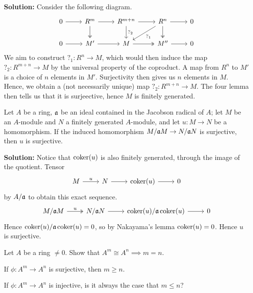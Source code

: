 \documentclass{article}
\begin{document}
\noindent\textbf{Solution:}
Consider the following diagram.
\[
    \begin{tikzcd}
        0 \arrow[r] & R^m \arrow[r] \arrow[d, two heads] & R^{m+n} \arrow[r] \arrow[d, "?_2"] & R^n \arrow[r] \arrow[dl, "?_1"] \arrow[d, two heads] & 0 \\
        0 \arrow[r] & M' \arrow[r] & M \arrow[r, two heads] & M'' \arrow[r] & 0
    \end{tikzcd}
\]
We aim to construct \(?_1 : R^n \to M\), which would then induce the map \(?_2 : R^{m+n} \to M\) by the universal property of the coproduct.
A map from \(R^n\) to \(M'\) is a choice of \(n\) elements in \(M'\).
Surjectivity then gives us \(n\) elements in \(M\).
Hence, we obtain a (not necessarily unique) map \(?_2 : R^{m+n} \to M\).
The four lemma then tells us that it is surjeective, hence \(M\) is finitely generated.

\begin{exercise}
    Let \(A\) be a ring, \(\mathfrak{a}\) be an ideal contained in the Jacobson radical of \(A\); let \(M\) be an \(A\)-module and \(N\) a finitely generated \(A\)-module, and let \(u : M \to N\) be a homomorphism.
    If the induced homomorphism \(M/\mathfrak{a} M \to N/\mathfrak{a} N\) is surjective, then \(u\) is surjective.
\end{exercise}

\noindent\textbf{Solution:}
Notice that \(\operatorname{coker}(u)\) is also finitely generated, through the image of the quotient.
Tensor
\[
    \begin{tikzcd}
        M \arrow[r, "u"] & N \arrow[r] & \coker(u) \arrow[r] & 0
    \end{tikzcd}
\]
by \(A/\mathfrak{a}\) to obtain this exact sequence.
\[
    \begin{tikzcd}
        M/\ideala M \arrow[r, two heads, "u"] & N/\ideala N \arrow[r] & \coker(u)/\ideala \coker(u) \arrow[r] & 0
    \end{tikzcd}
\]
Hence \(\operatorname{coker}(u) / \mathfrak{a} \operatorname{coker}(u) = 0\), so by Nakayama's lemma \(\operatorname{coker}(u) = 0\).
Hence \(u\) is surjective.

\begin{exercise}
    Let \(A\) be a ring \(\neq 0\).
    Show that \(A^m \cong A^n \implies m = n\).

    If \(\phi : A^m \to A^n\) is surjective, then \(m \geq n\).

    If \(\phi : A^m \to A^n\) is injective, is it always the case that \(m \leq n\)?
\end{exercise}
\end{document}
